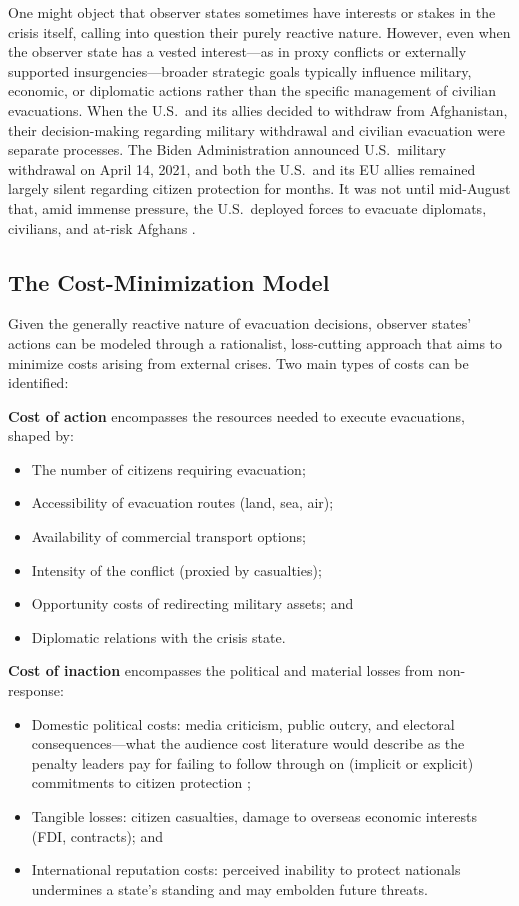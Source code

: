 \documentclass[12pt]{article}
\begin{document}
One might object that observer states sometimes have interests or stakes in the crisis itself, calling into question their purely reactive nature. However, even when the observer state has a vested interest---as in proxy conflicts or externally supported insurgencies---broader strategic goals typically influence military, economic, or diplomatic actions rather than the specific management of civilian evacuations. When the U.S.\ and its allies decided to withdraw from Afghanistan, their decision-making regarding military withdrawal and civilian evacuation were separate processes. The Biden Administration announced U.S.\ military withdrawal on April 14, 2021, and both the U.S.\ and its EU allies remained largely silent regarding citizen protection for months. It was not until mid-August that, amid immense pressure, the U.S.\ deployed forces to evacuate diplomats, civilians, and at-risk Afghans \citep{Riekeles2023}.

\subsection{The Cost-Minimization Model}

Given the generally reactive nature of evacuation decisions, observer states' actions can be modeled through a rationalist, loss-cutting approach that aims to minimize costs arising from external crises. Two main types of costs can be identified:

\textbf{Cost of action} encompasses the resources needed to execute evacuations, shaped by:
\begin{itemize}
    \item The number of citizens requiring evacuation;
    \item Accessibility of evacuation routes (land, sea, air);
    \item Availability of commercial transport options;
    \item Intensity of the conflict (proxied by casualties);
    \item Opportunity costs of redirecting military assets; and
    \item Diplomatic relations with the crisis state.
\end{itemize}

\textbf{Cost of inaction} encompasses the political and material losses from non-response:
\begin{itemize}
    \item Domestic political costs: media criticism, public outcry, and electoral consequences---what the audience cost literature would describe as the penalty leaders pay for failing to follow through on (implicit or explicit) commitments to citizen protection \citep{Fearon1994};
    \item Tangible losses: citizen casualties, damage to overseas economic interests (FDI, contracts); and
    \item International reputation costs: perceived inability to protect nationals undermines a state's standing and may embolden future threats.
\end{itemize}
\end{document}
